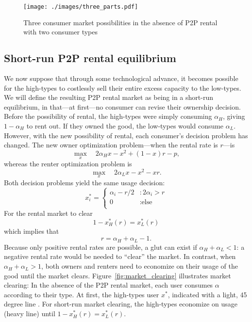 \documentclass[11pt]{article}
\begin{document}
\begin{figure}
\centering 
\caption{Three consumer market possibilities in the absence of P2P rental with two consumer types}
\label{fig:three_types} 
\begin{minipage}{0.8 \textwidth} 
\texttt{[image: ./images/three\_parts.pdf]} 
\end{minipage}  
\end{figure} 

\subsection{Short-run P2P rental equilibrium} 
We now suppose that through some technological advance, it becomes possible for the high-types to costlessly sell their entire excess capacity to the low-types. 
We will define the resulting P2P rental market as being in a short-run equilibrium, in that---at first---no consumer can revise their ownership decision. 
Before the possibility of rental, the high-types were simply consuming $\alpha_H$, giving $1-\alpha_H$ to rent out.
If they owned the good, the low-types would consume $\alpha_L$. 
However, with the new possibility of rental, each consumer's decision problem has changed. 
The new owner optimization problem---when the rental rate is $r$---is 
\begin{equation}
\max_x \quad 2\alpha_H x - x^2 + (1-x)r - p,   
\end{equation} 
whereas the renter optimization problem is 
\begin{equation}
\max_x \quad 2 \alpha_L x - x^2 - xr.  
\end{equation} 
Both decision problems yield the same usage decision: 
\begin{equation}
x^*_i = \left\{
     \begin{array}{ll}
       \alpha_i - r/2 & : 2\alpha_i > r \\
       0 & : \mbox{else}  \\
     \end{array}
   \right.
\end{equation} 
For the rental market to clear 
\begin{equation} 
1 - x^*_H(r) = x^*_L(r)
\end{equation}   
which implies that 
\begin{equation} \label{eq:strr} 
r = \alpha_H + \alpha_L - 1.  
\end{equation} 
Because only positive rental rates are possible, a glut can exist if $\alpha_H + \alpha_L < 1$: a negative rental rate would be needed to ``clear'' the market.
In contrast, when $\alpha_H + \alpha_L > 1$, both owners and renters need to economize on their usage of the good until the market clears.   
Figure~\ref{fig:market_clearing} illustrates market clearing: 
In the absence of the P2P rental market, each user consumes $\alpha$ according to their type. 
At first, the high-types user $x^*$, indicated with a light, 45 degree line . 
For short-run market clearing, the high-types economize on usage (heavy line) until $1-x_H^*(r) = x_L^*(r)$. 
\end{document}

